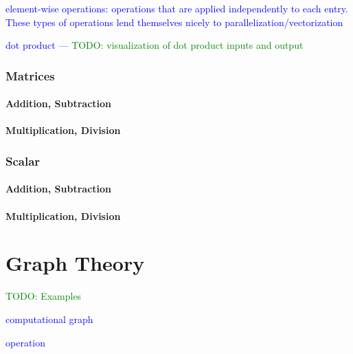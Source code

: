 \textcolor{blue}{{element-wise} operations: operations that are applied independently to each entry. These types of operations lend themselves nicely to parallelization/vectorization}

\textcolor{blue}{dot product --- \textcolor{green}{TODO: visualization of dot product inputs and output}}

\subsubsection{Matrices}

\paragraph{Addition, Subtraction}

\paragraph{Multiplication, Division}

\subsubsection{Scalar}

\paragraph{Addition, Subtraction}

\paragraph{Multiplication, Division}



\section{Graph Theory}

\textcolor{green}{TODO: Examples}

\textcolor{blue}{computational graph}

\textcolor{blue}{operation}

